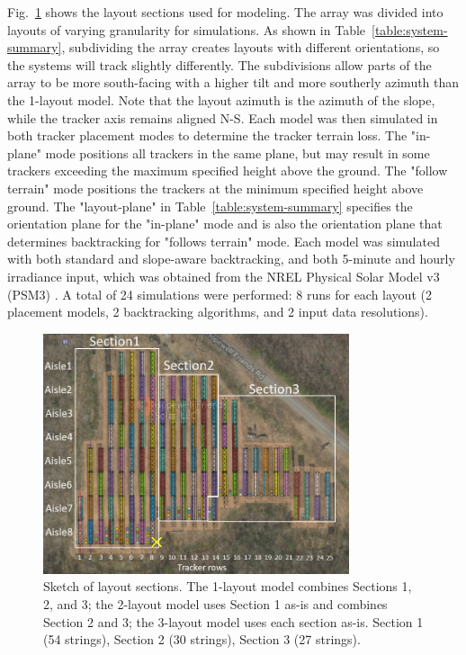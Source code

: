 \documentclass[conference]{IEEEtran}
\begin{document}
Fig.~\ref{fig:layouts} shows the layout sections used for modeling. The array was divided into layouts of varying granularity for simulations. As shown in Table~\ref{table:system-summary}, subdividing the array creates layouts with different orientations, so the systems will track slightly differently. The subdivisions allow parts of the array to be more south-facing with a higher tilt and more southerly azimuth than the 1-layout model. Note that the layout azimuth is the azimuth of the slope, while the tracker axis remains aligned N-S. Each model was then simulated in both tracker placement modes to determine the tracker terrain loss. The "in-plane" mode positions all trackers in the same plane, but may result in some trackers exceeding the maximum specified height above the ground. The "follow terrain" mode positions the trackers at the minimum specified height above ground. The "layout-plane" in Table~\ref{table:system-summary} specifies the orientation plane for the "in-plane" mode and is also the orientation plane that determines backtracking for "follows terrain" mode. Each model was simulated with both standard \cite{Marion2013} and slope-aware \cite{Anderson2020} backtracking, and both 5-minute and hourly irradiance input, which was obtained from the NREL Physical Solar Model v3 (PSM3) \cite{Sengupta2018}. A total of 24 simulations were performed: 8 runs for each layout (2 placement models, 2 backtracking algorithms, and 2 input data resolutions).

\begin{figure}[htbp]
\centerline{\includegraphics[width=9cm]{layouts.jpg}}
\caption{Sketch of layout sections. The 1-layout model combines Sections 1, 2, and 3; the 2-layout model uses Section 1 as-is and combines Section 2 and 3; the 3-layout model uses each section as-is. Section 1 (54 strings), Section 2 (30 strings), Section 3 (27 strings).}
\label{fig:layouts}
\end{figure}
\end{document}
